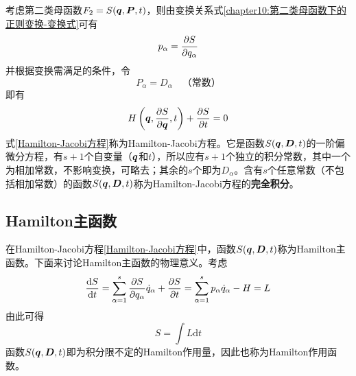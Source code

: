 考虑第二类母函数$F_2 = S(\boldsymbol{q},\boldsymbol{P},t)$，则由变换关系式\eqref{chapter10:第二类母函数下的正则变换-变换式}可有
\begin{equation*}
	p_\alpha = \frac{\partial S}{\partial q_\alpha}
\end{equation*}
并根据变换需满足的条件，令
\begin{equation}
	P_\alpha = D_\alpha\quad \text{（常数）}
\end{equation}
即有
\begin{equation}
	H\left(\boldsymbol{q},\frac{\partial S}{\partial \boldsymbol{q}},t\right) + \frac{\partial S}{\partial t} = 0
	\label{Hamilton-Jacobi方程}
\end{equation}
式\eqref{Hamilton-Jacobi方程}称为{\heiti Hamilton-Jacobi方程}。它是函数$S(\boldsymbol{q},\boldsymbol{D},t)$的一阶偏微分方程，有$s+1$个自变量（$\boldsymbol{q}$和$t$），所以应有$s+1$个独立的积分常数，其中一个为相加常数，不影响变换，可略去；其余的$s$个即为$D_\alpha$。含有$s$个任意常数（不包括相加常数）的函数$S(\boldsymbol{q},\boldsymbol{D},t)$称为Hamilton-Jacobi方程的{\bf 完全积分}。

\subsection{Hamilton主函数}

在Hamilton-Jacobi方程\eqref{Hamilton-Jacobi方程}中，函数$S(\boldsymbol{q},\boldsymbol{D},t)$称为{\heiti Hamilton主函数}。下面来讨论Hamilton主函数的物理意义。考虑
\begin{equation}
	\frac{\mathrm{d} S}{\mathrm{d} t} = \sum_{\alpha=1}^s \frac{\partial S}{\partial q_\alpha} \dot{q}_\alpha + \frac{\partial S}{\partial t} = \sum_{\alpha=1}^s p_\alpha \dot{q}_\alpha - H = L
\end{equation}
由此可得
\begin{equation}
	S = \int L \mathrm{d} t
	\label{Hamilton作用函数}
\end{equation}
函数$S(\boldsymbol{q},\boldsymbol{D},t)$即为积分限不定的Hamilton作用量，因此也称为{\heiti Hamilton作用函数}。

